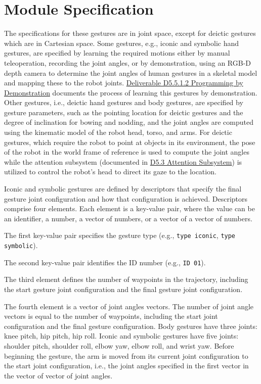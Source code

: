 \documentclass{CSSRforAfrica}
\begin{document}
\newpage
\section{Module Specification}

The specifications for these gestures are in joint space, except for deictic gestures which are in
Cartesian space. Some gestures, e.g., iconic and symbolic hand gestures, are specified by learning the required motions either by manual teleoperation, recording the joint angles, or by demonstration, using an RGB-D depth camera to determine the joint angles of human gestures in a skeletal model and mapping these to the robot joints. \href{https://cssr4africa.github.io/deliverables/CSSR4Africa_Deliverable_D5.5.1.2.pdf} {Deliverable D5.5.1.2 Programming by Demonstration} documents the process of learning this gestures by demonstration. Other gestures, i.e., deictic hand gestures and body gestures, are specified by gesture parameters, such as the pointing location for deictic gestures and the degree of inclination for bowing and nodding, and the joint angles are computed using the kinematic model of the robot head, torso, and arms. For deictic gestures, which require the robot to point at objects in its environment, the pose of the robot in the world frame of reference is  used to compute the joint angles while the attention subsystem (documented in \href{https://cssr4africa.github.io/deliverables/CSSR4Africa_Deliverable_D5.3.pdf} {D5.3 Attention Subsystem}) is utilized to control the robot's head to direct its gaze to the location.

Iconic and symbolic gestures are defined by descriptors that specify the final gesture joint configuration and how that configuration is achieved. Descriptors comprise four elements. Each element is a key-value pair, where the value can be an identifier, a number, a vector of numbers, or a vector of a vector of numbers.

The first key-value pair specifies the gesture type (e.g., \texttt{type iconic}, \texttt{type symbolic}).

The second key-value pair identifies the ID number (e.g., \texttt{ID 01}).

The third element defines the number of waypoints in the trajectory, including the start gesture joint configuration and the final gesture joint configuration.

The fourth element is a vector of joint angles vectors. The number of joint angle vectors is equal
to the number of waypoints, including the start joint configuration and the final gesture configuration. Body gestures have three joints: knee pitch, hip pitch, hip roll. Iconic and symbolic gestures have five joints: shoulder pitch, shoulder roll, elbow yaw, elbow roll, and wrist yaw. Before beginning the gesture, the arm is moved from its current joint configuration to the start joint configuration, i.e., the joint angles specified in the first vector in the vector of vector of joint angles.
\end{document}
